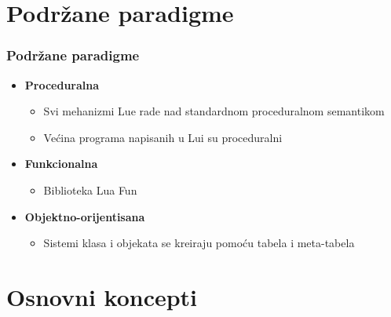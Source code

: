 \documentclass{beamer}
\begin{document}
\section{Podržane paradigme}
\begin{frame}
\frametitle{Podržane paradigme}

\begin{itemize}

\item \textbf{Proceduralna}
\begin{itemize}
\item Svi mehanizmi Lue rade nad standardnom proceduralnom semantikom
\item Većina programa napisanih u Lui su proceduralni
\end{itemize}

\item \textbf{Funkcionalna}
\begin{itemize}
\item Biblioteka Lua Fun
\end{itemize}

\item \textbf{Objektno-orijentisana}
\begin{itemize}
\item Sistemi klasa i objekata se kreiraju pomoću tabela i meta-tabela
\end{itemize}


\end{itemize}

\end{frame}



\section{Osnovni koncepti}
\end{document}
